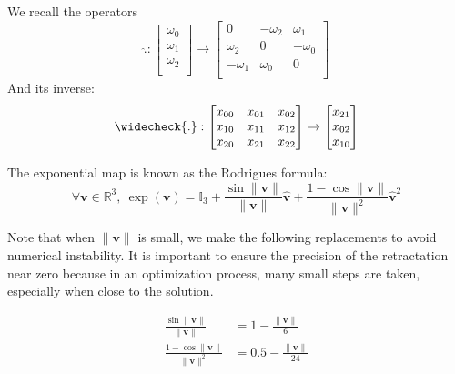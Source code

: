 We recall the operators
\begin{equation}
\widehat{.}: \begin{bmatrix}
  \omega_0\\\omega_1\\\omega_2\\
\end{bmatrix}
\rightarrow
\begin{bmatrix}
  0 & -\omega_2 & \omega_1 \\
  \omega_2 & 0 & -\omega_0 \\
  -\omega_1 & \omega_0 & 0\\
\end{bmatrix}
\end{equation}
And its inverse:
\begin{equation}
\widecheck{.}: \begin{bmatrix}
    x_{00} & x_{01} & x_{02} \\
    x_{10} & x_{11} & x_{12} \\
    x_{20} & x_{21} & x_{22} \\
\end{bmatrix}
\rightarrow
\begin{bmatrix}
  x_{21}\\x_{02}\\x_{10}\\
\end{bmatrix}
\end{equation}


The exponential map is known as the Rodrigues formula:
\begin{equation}
  \forall \mathbf{v}\in\mathbb{R}^3,\ \exp(\mathbf{v}) = \mathbb{I}_3 +
  \frac{\sin \|\mathbf{v}\|}{\|\mathbf{v}\|} \hat{\mathbf{v}} +
  \frac{1-\cos \|\mathbf{v}\|}{\|\mathbf{v}\|^2} \hat{\mathbf{v}}^2
\end{equation}

Note that when $\|\mathbf{v}\|$ is small, we make the following replacements to avoid numerical instability.
It is important to ensure the precision of the retractation near zero because in an optimization process, many small steps are taken, especially when close to the solution.

\begin{align}
 \frac{\sin \|\mathbf{v}\|}{\|\mathbf{v}\|} & = 1-\frac{\|\mathbf{v}\|}{6}\\
 \frac{1-\cos \|\mathbf{v}\|}{\|\mathbf{v}\|^2} & = 0.5 - \frac{\|\mathbf{v}\|}{24}
\end{align}

